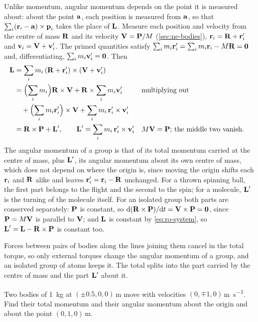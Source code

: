 Unlike momentum, angular momentum depends on the point it is measured
about: about the point $\bm{\mathrm{a}}$, each position is measured from $\bm{\mathrm{a}}$,
so that $\sum_i(\bm{\mathrm{r}}_i - \bm{\mathrm{a}})\times\bm{\mathrm{p}}_i$ takes the place of
$\bm{\mathrm{L}}$. Measure each position and velocity from the centre of mass
$\bm{\mathrm{R}}$ and its velocity $\bm{\mathrm{V}} = \bm{\mathrm{P}}/M$ (\cref{sec:ne-bodies}),
$\bm{\mathrm{r}}_i = \bm{\mathrm{R}} + \bm{\mathrm{r}}_i'$ and $\bm{\mathrm{v}}_i = \bm{\mathrm{V}} + \bm{\mathrm{v}}_i'$. The
primed quantities satisfy $\sum_i m_i\bm{\mathrm{r}}_i' = \sum_i m_i\bm{\mathrm{r}}_i -
M\bm{\mathrm{R}} = \bm{\mathrm{0}}$ and, differentiating, $\sum_i m_i\bm{\mathrm{v}}_i' = \bm{\mathrm{0}}$.
Then
\begin{align*}
   \bm{\mathrm{L}} &= \sum_i m_i\,(\bm{\mathrm{R}} + \bm{\mathrm{r}}_i')\times(\bm{\mathrm{V}} + \bm{\mathrm{v}}_i')\\
   &= \Bigl(\sum_i m_i\Bigr)\bm{\mathrm{R}}\times\bm{\mathrm{V}}
      + \bm{\mathrm{R}}\times\sum_i m_i\bm{\mathrm{v}}_i'
      && \text{multiplying out}\\
   &\quad + \Bigl(\sum_i m_i\bm{\mathrm{r}}_i'\Bigr)\times\bm{\mathrm{V}}
      + \sum_i m_i\,\bm{\mathrm{r}}_i'\times\bm{\mathrm{v}}_i'\\
   &= \bm{\mathrm{R}}\times\bm{\mathrm{P}} + \bm{\mathrm{L}}' ,
   \qquad \bm{\mathrm{L}}' = \sum_i m_i\,\bm{\mathrm{r}}_i'\times\bm{\mathrm{v}}_i'
   && \text{$M\bm{\mathrm{V}} = \bm{\mathrm{P}}$; the middle two vanish.}
\end{align*}
The angular momentum of a group is that of its total momentum carried at
the centre of mass, plus $\bm{\mathrm{L}}'$, its angular momentum about its own
centre of mass, which does not depend on where the origin is, since moving the origin
shifts each $\bm{\mathrm{r}}_i$ and $\bm{\mathrm{R}}$ alike and leaves $\bm{\mathrm{r}}_i' = \bm{\mathrm{r}}_i
- \bm{\mathrm{R}}$ unchanged. For a
thrown spinning ball, the first part belongs to the flight and the second
to the spin; for a molecule, $\bm{\mathrm{L}}'$ is the turning of the molecule
itself. For an isolated group both parts are conserved separately: $\bm{\mathrm{P}}$
is constant, so $\mathrm{d}(\bm{\mathrm{R}}\times\bm{\mathrm{P}})/\mathrm{d} t = \bm{\mathrm{V}}\times\bm{\mathrm{P}} =
\bm{\mathrm{0}}$, since $\bm{\mathrm{P}} = M\bm{\mathrm{V}}$ is parallel to $\bm{\mathrm{V}}$; and $\bm{\mathrm{L}}$ is
constant by \cref{eq:ro-system}, so $\bm{\mathrm{L}}' = \bm{\mathrm{L}} - \bm{\mathrm{R}}\times\bm{\mathrm{P}}$
is constant too.

\begin{keyidea}
Forces between pairs of bodies along the lines joining them cancel in the
total torque, so only external torques change the angular momentum of a
group, and an isolated group of atoms keeps it. The total splits into the
part carried by the centre of mass and the part $\bm{\mathrm{L}}'$ about it.
\end{keyidea}

\begin{selfcheck}
Two bodies of \SI{1}{\kilogram} at $(\pm0.5, 0, 0)$\,\si{\metre} move with
velocities $(0, \mp1, 0)$\,\si{\metre\per\second}. Find their total
momentum and their angular momentum about the origin and about the point
$(0, 1, 0)$\,\si{\metre}.
\end{selfcheck}

